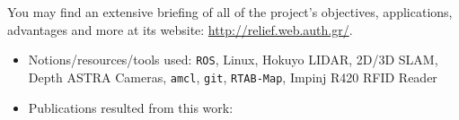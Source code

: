 You may find an extensive briefing of all of the project's objectives,
applications, advantages and more at its website:
\url{http://relief.web.auth.gr/}.



\begin{itemize}
  \item Notions/resources/tools used: \texttt{ROS}, Linux, Hokuyo LIDAR, 2D/3D SLAM, Depth ASTRA Cameras, \texttt{amcl}, \texttt{git}, \texttt{RTAB-Map}, Impinj R420 RFID Reader
\item Publications resulted from this work: \cite{8739423,8739486,Filotheou2020a,9109328,9244904,Filotheou2020b,9566425,9617436}
\end{itemize}

